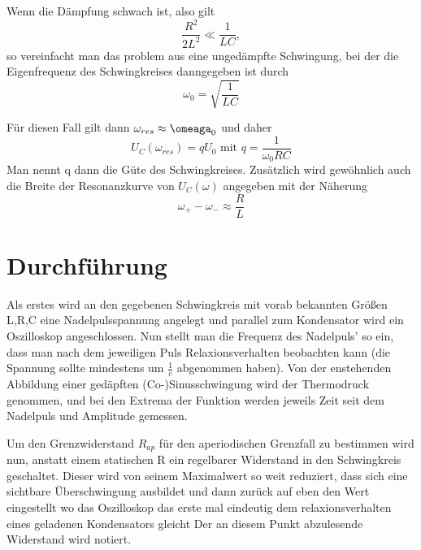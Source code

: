         Wenn die Dämpfung schwach ist, also gilt
        \begin{equation*}
            \frac{R^2}{2L^2}\ll \frac{1}{LC},
        \end{equation*}
        so vereinfacht man das problem aus eine ungedämpfte Schwingung, bei der die Eigenfrequenz des Schwingkreises danngegeben ist durch
        \begin{equation}
            \omega_0 = \sqrt{\frac{1}{LC}}
        \end{equation}

        Für diesen Fall gilt dann $\omega_{res} \approx \omeaga_0$ und daher
        \begin{equation}
            \label{eqn:Güte}
            U_C(\omega_{res})= qU_0
            \text { mit }
             q=\frac{1}{\omega_0 RC}
        \end{equation}
        Man nennt q dann die Güte des Schwingkreises. Zusätzlich wird gewöhnlich auch die Breite der Resonanzkurve von $U_C(\omega)$ angegeben
        mit der Näherung
        \begin{equation}
            \label{eqn:Breite}
            \omega_+ -\omega_- \approx \frac{R}{L}
        \end{equation}

    \section{Durchführung}
    \label{sec:Durchführung}
    Als erstes wird an den gegebenen Schwingkreis mit vorab bekannten Größen L,R,C
    eine Nadelpulsspannung angelegt und parallel zum Kondensator wird ein Oszilloskop angeschlossen.
    Nun stellt man die Frequenz des Nadelpuls' so ein, dass man nach dem jeweiligen Puls Relaxionsverhalten beobachten kann
    (die Spannung sollte mindestens um $\frac{1}{e}$ abgenommen haben).
    Von der enstehenden Abbildung einer gedäpften (Co-)Sinusschwingung wird der Thermodruck genommen,
    und bei den Extrema der Funktion werden jeweils Zeit seit dem Nadelpuls und Amplitude gemessen.

    Um den Grenzwiderstand $R_{ap}$ für den aperiodischen Grenzfall zu bestimmen wird nun,
    anstatt einem statischen R ein regelbarer Widerstand in den Schwingkreis geschaltet.
    Dieser wird von seinem Maximalwert so weit reduziert, dass sich eine sichtbare Überschwingung ausbildet
    und dann zurück auf eben den Wert eingestellt wo das Oszilloskop das erste mal eindeutig dem relaxionsverhalten eines geladenen Kondensators gleicht
    Der an diesem Punkt abzulesende Widerstand wird notiert.

